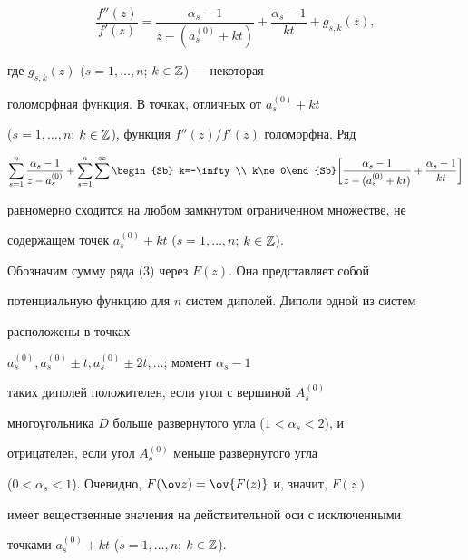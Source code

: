 $$ 


\frac{f''(z)}{f'(z)}=\frac{\alpha_s-1}{z-(a^{(0)}_s+kt)}+ 


\frac{\alpha_s-1}{kt}+g_{s,k}(z), 


$$ 


где $g_{s,k}(z)$ ($s=1,\dotsc,n$; $k\in\Bbb Z$) --- некоторая 


голоморфная функция. В точках, отличных от $a^{(0)}_s+kt$ 


($s=1,\dotsc,n$; $k\in \Bbb Z$), функция $f''(z)/f'(z)$ голоморфна. Ряд 


\begin{equation} 


\sum^n_{s=1}\frac{\alpha_s-1}{z-a^{(0)}_s}+ 


\sum^n_{s=1}\sum^\infty 


\begin{Sb} k=-\infty \\ k\ne 0\end{Sb} 


\bigg[\frac{\alpha_s-1}{z-(a^{(0)}_s+kt)}+ 


\frac{\alpha_s-1}{kt}\bigg] 


\end{equation} 


равномерно сходится на любом замкнутом ограниченном множестве, не 


содержащем точек $a^{(0)}_s+kt$ ($s=1,\dotsc,n$; $k\in \Bbb Z$). 


Обозначим сумму ряда (3) через $F(z)$. Она представляет собой 


потенциальную функцию для $n$ систем диполей. Диполи одной из систем 


расположены в точках 


$a^{(0)}_s,a^{(0)}_s\pm t,a^{(0)}_s\pm2t,\dotsc$; момент $\alpha_s-1$ 


таких диполей положителен, если угол с вершиной $A^{(0)}_s$ 


многоугольника $D$ больше развернутого угла ($1<\alpha_s<2$), и 


отрицателен, если угол $A^{(0)}_s$ меньше развернутого угла 


($0<\alpha_s<1$). Очевидно, $F(\ov z)=\ov{F(z)}$ и, значит, $F(z)$ 


имеет вещественные значения на действительной оси с исключенными 


точками $a^{(0)}_s+kt$ ($s=1,\dotsc,n$; $k\in\Bbb Z$). 


 


